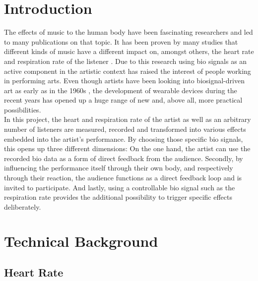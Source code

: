 \documentclass{sigchi-ext}
\begin{document}
\section{Introduction}
The effects of music to the human body have been fascinating researchers and led to
many publications on that topic. It has been proven by many studies that
different kinds of music have a different impact on, amongst others, the heart rate and
respiration rate of the listener \cite{dousty,shin,tsuroka,inesta2008heart}. Due to this research
using bio signals as an active component in the artistic context has raised the 
interest of people working in performing arts. Even though artists have been looking into 
biosignal-driven art as early as in the 1960s \cite{history_biosignal_art}, the development
of wearable devices during the recent years has opened up a huge range of new and, above
all, more practical possibilities. \\
In this project, the heart and respiration rate of the artist as well as an arbitrary number
of listeners are measured, recorded and transformed into various effects embedded into the
artist's performance. By choosing those specific bio signals, this opens up three different
dimensions: On the one hand, the artist can use the recorded bio data as a form of direct
feedback from the audience. Secondly, by influencing the performance itself through their
own body, and respectively through their reaction, the audience functions as a direct feedback
loop and is invited to participate. And lastly, using a controllable
bio signal such as the respiration rate provides the additional possibility to trigger specific
effects deliberately.

\section{Technical Background}

\subsection{Heart Rate}
\end{document}
